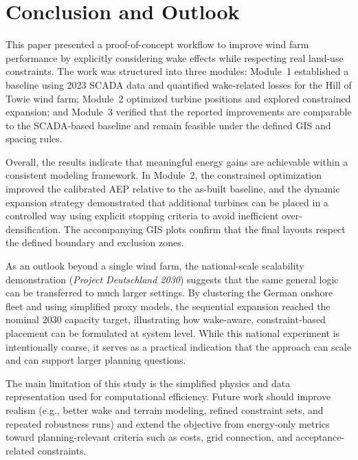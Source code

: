 \documentclass[lettersize,journal]{IEEEtran}
\begin{document}
\section{Conclusion and Outlook}
\label{sec:conclusion}

This paper presented a proof-of-concept workflow to improve wind farm performance by explicitly considering wake effects while respecting real land-use constraints. The work was structured into three modules: Module~1 established a baseline using 2023 SCADA data and quantified wake-related losses for the Hill of Towie wind farm; Module~2 optimized turbine positions and explored constrained expansion; and Module~3 verified that the reported improvements are comparable to the SCADA-based baseline and remain feasible under the defined GIS and spacing rules.

Overall, the results indicate that meaningful energy gains are achievable within a consistent modeling framework. In Module~2, the constrained optimization improved the calibrated AEP relative to the as-built baseline, and the dynamic expansion strategy demonstrated that additional turbines can be placed in a controlled way using explicit stopping criteria to avoid inefficient over-densification. The accompanying GIS plots confirm that the final layouts respect the defined boundary and exclusion zones.

As an outlook beyond a single wind farm, the national-scale scalability demonstration (\textit{Project Deutschland 2030}) suggests that the same general logic can be transferred to much larger settings. By clustering the German onshore fleet and using simplified proxy models, the sequential expansion reached the nominal 2030 capacity target, illustrating how wake-aware, constraint-based placement can be formulated at system level. While this national experiment is intentionally coarse, it serves as a practical indication that the approach can scale and can support larger planning questions.

The main limitation of this study is the simplified physics and data representation used for computational efficiency. Future work should improve realism (e.g., better wake and terrain modeling, refined constraint sets, and repeated robustness runs) and extend the objective from energy-only metrics toward planning-relevant criteria such as costs, grid connection, and acceptance-related constraints.



\enlargethispage{3.5\baselineskip}



\end{document}

